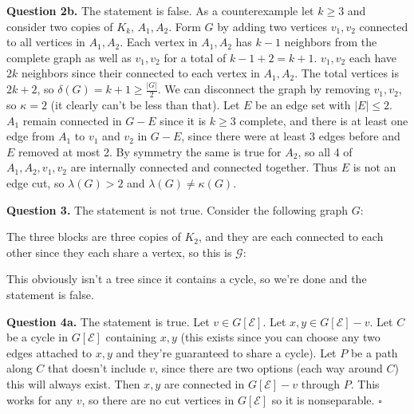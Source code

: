 \documentclass[letterpaper, reqno,11pt]{article}
\begin{document}
{\medskip\noindent\bf Question 2b.} The statement is false. As a counterexample let $k\geq 3$ and consider two copies of $K_k$, $A_1,A_2$. Form $G$ by adding two vertices $v_1,v_2$ connected to all vertices in $A_1,A_2$. Each vertex in $A_1,A_2$ has $k-1$ neighbors from the complete graph as well as $v_1,v_2$ for a total of $k-1+2=k+1$. $v_1,v_2$ each have $2k$ neighbors since their connected to each vertex in $A_1,A_2$. The total vertices is $2k+2$, so $\delta(G)=k+1\geq \frac{|G|}{2}$. We can disconnect the graph by removing $v_1,v_2$, so $\kappa=2$ (it clearly can't be less than that). Let $E$ be an edge set with $|E|\leq 2$. $A_1$ remain connected in $G-E$ since it is $k\geq 3$ complete, and there is at least one edge from $A_1$ to $v_1$ and $v_2$ in $G-E$, since there were at least $3$ edges before and $E$ removed at most 2. By symmetry the same is true for $A_2$, so all 4 of $A_1,A_2,v_1,v_2$ are internally connected and connected together. Thus $E$ is not an edge cut, so $\lambda(G)>2$ and $\lambda(G)\neq \kappa(G)$.  

{\medskip\noindent\bf Question 3.} The statement is not true. Consider the following graph $G$: 

\begin{center}
\end{center}

The three blocks are three copies of $K_2$, and they are each connected to each other since they each share a vertex, so this is $\mathcal{G}$: 

\begin{center}
\end{center}

This obviously isn't a tree since it contains a cycle, so we're done and the statement is false. 

{\medskip\noindent\bf Question 4a.} The statement is true. Let $v\in G[\mathcal{E}]$. Let $x,y\in G[\mathcal{E}]-v$. Let $C$ be a cycle in $G[\mathcal E]$ containing $x,y$ (this exists since you can choose any two edges attached to $x,y$ and they're guaranteed to share a cycle). Let $P$ be a path along $C$ that doesn't include $v$, since there are two options (each way around $C$) this will always exist. Then $x,y$ are connected in $G[\mathcal{E}]-v$ through $P$. This works for any $v$, so there are no cut vertices in $G[\mathcal{E}]$ so it is nonseparable. $\square$
\end{document}
